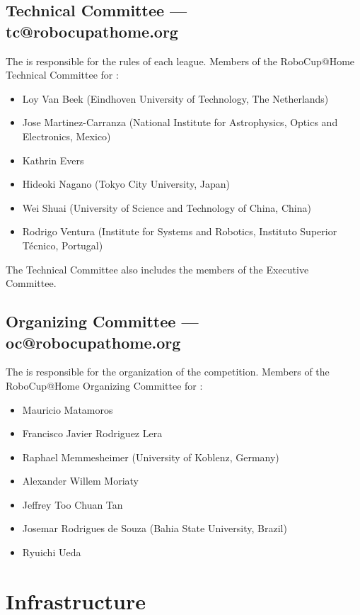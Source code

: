\subsection{Technical Committee --- tc@robocupathome.org}
\label{sec:tc}
The  is responsible for the rules of each league. Members of the RoboCup@Home Technical Committee for \YEAR:
\begin{itemize}
  \item Loy Van Beek (Eindhoven University of Technology, The Netherlands)
  \item Jose Martinez-Carranza (National Institute for Astrophysics, Optics and Electronics, Mexico)
  \item Kathrin Evers
  \item Hideoki Nagano (Tokyo City University, Japan)
  \item Wei Shuai (University of Science and Technology of China, China)
  \item Rodrigo Ventura (Institute for Systems and Robotics, Instituto Superior Técnico, Portugal)
\end{itemize}
The Technical Committee also includes the members of the Executive Committee.

\subsection{Organizing Committee --- oc@robocupathome.org}
\label{sec:oc}
The  is responsible for the organization of the competition. Members of the RoboCup@Home Organizing Committee for \YEAR:

\begin{itemize}
  \item Mauricio Matamoros 
  \item Francisco Javier Rodriguez Lera 
  \item Raphael Memmesheimer (University of Koblenz, Germany)
  \item Alexander Willem Moriaty 
  \item Jeffrey Too Chuan Tan 
  \item Josemar Rodrigues de Souza (Bahia State University, Brazil)
  \item Ryuichi Ueda
\end{itemize}

\section{Infrastructure}
\label{sec:infrastructure}
